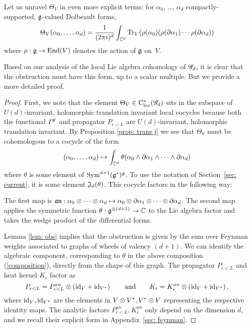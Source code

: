 Let us unravel $\Theta_V$ in even more explicit terms:
for $\alpha_0$, \dots, $\alpha_d$ compactly-supported, $\mathfrak g$-valued Dolbeault forms,
\[
\Theta_V(\alpha_0, \ldots, \alpha_d) = \frac{1}{(2\pi i)^d} \int_{\mathbb C^d} {\rm Tr}_V(\rho(\alpha_0) (\rho(\partial\alpha_1) \cdots \rho(\partial \alpha_d))
\]
where $\rho: \mathfrak g \to {\rm End}(V)$ denotes the action of $\mathfrak g$ on~$V$.

Based on our analysis of the local Lie algebra cohomology of $\mathscr G_d$, 
it is clear that the obstruction must have this form, up to a scalar multiple. 
But we provide a more detailed proof.

\begin{proof}
First, we note that the element $\Theta_V \in {\rm C}_{\rm loc}^*(\mathscr G_d)$ sits in the subspace of $U(d)$-invariant, holomorphic translation invariant local cocycles because both the functional $I^{\mathscr G}$ and propagator $P_{\epsilon<L}$ are $U(d)$-invariant, holomorphic translation invariant.
By Proposition \ref{prop: trans j} we see that $\Theta_V$ must be cohomologous to a cocycle of the form
\[
(\alpha_0, \ldots, \alpha_d) \mapsto \int_{\mathbb C^d} \theta(\alpha_0 \wedge \partial \alpha_1 \wedge \cdots \wedge \partial \alpha_d) 
\]
where $\theta$ is some element of ${\rm Sym}^{d+1}(\mathfrak g^*)^\mathfrak g$.
To use the notation of Section~\ref{sec: current}, it is some element $\mathfrak J_d (\theta)$. 
This cocycle factors in the following way:
\beqn
\label{composition}
\eeqn
The first map is $\mathfrak a \mathfrak n : \alpha_0 \otimes \cdots \otimes \alpha_d \mapsto \alpha_0 \otimes \partial \alpha_1 \otimes \cdots \otimes \partial \alpha_d$.
The second map applies the symmetric function $\theta : \mathfrak g^{\otimes (d+1)} \to \mathbb C$ to the Lie algebra factor and takes the wedge product of the differential forms. 

Lemma \ref{lem: obs} implies that the obstruction is given by the sum over Feynman weights associated to graphs of wheels of valency $(d+1)$.
We can identify the algebraic component, corresponding to $\theta$ in the above composition (\ref{composition}), directly from the shape of this graph. 
The propagator $P_{\epsilon<L}$ and heat kernel $K_\epsilon$ factor as
\[
P_{\epsilon<L} = P^{an}_{\epsilon<L} \otimes \left({\rm id}_{V} + {\rm id}_{V^*}\right)
\quad\quad\text{and}\quad\quad 
K_{\epsilon} = K_{\epsilon}^{an} \otimes \left({\rm id}_{V} + {\rm id}_{V^*}\right),
\]
where ${\rm id}_V, {\rm id}_{V^*}$ are the elements in $V \otimes V^*, V^* \otimes V$ representing the respective identity maps. 
The analytic factors $P^{an}_{\epsilon<L},  K_{\epsilon}^{an}$ only depend on the dimension $d$, and we recall their explicit form in Appendix~\ref{sec: feynman}. 


\end{proof}
